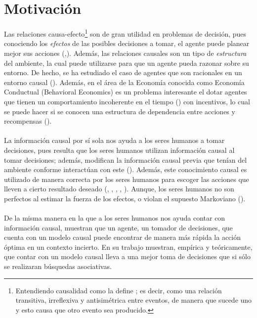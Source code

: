 \documentclass[11pt]{article}
\theoremstyle{plain}
\begin{document}
\section{Motivación}
Las relaciones causa-efecto\footnote{Entendiendo causalidad como la define \cite{spirtes2000causation}; es decir, como una relación transitiva, irreflexiva y antisimétrica entre eventos, de manera que sucede uno y esto causa que otro evento sea producido.} son de gran utilidad en problemas de decisión, pues conociendo los \textit{efectos} de las posibles decisiones a tomar, el agente puede planear mejor sus acciones (\cite{hagmayer2013repeated},\cite{pearlwhy}). Además, las relaciones causales son un tipo de \textit{estructura} del ambiente, la cual puede utilizarse para que un agente pueda razonar sobre su entorno. De hecho, se ha estudiado el caso de agentes que son racionales en un entorno causal (\cite{board2006equivalence}). Además, en el área de la Economía conocida como Economía Conductual (Behavioral Economics) es un problema interesante el dotar agentes que tienen un comportamiento incoherente en el tiempo (\cite{kleinberg2014time}) con incentivos, lo cual se puede hacer si se conocen una estructura de dependencia entre acciones y recompensas (\cite{albers2016motivating}). \\
\\
\indent La información causal por sí sola nos ayuda a los seres humanos a tomar decisiones, pues resulta que los seres humanos utilizan información causal al tomar decisiones; además, modifican la información causal previa que tenían del ambiente conforme interactúan con este (\cite{hagmayer2013repeated}). Además, este conocimiento causal es utilizado de manera correcta por los seres humanos para escoger las acciones que lleven a cierto resultado deseado (\cite{sloman2006causal}, \cite{nichols2007decision}, \cite{meder2010observing}, \cite{hagmayer2013repeated}, \cite{danks2014unifying}). Aunque, los seres humanos no son perfectos al estimar la fuerza de los efectos, o violan el supuesto Markoviano (\cite{rottman2014reasoning}). \\
\\
\indent De la misma manera en la que a los seres humanos nos ayuda contar con información causal, \cite{lattimoreNIPS2016} muestran que un agente, un tomador de decisiones, que cuenta con un modelo causal puede encontrar de manera más rápida la acción óptima en un contexto incierto. En su trabajo muestran, empírica y teóricamente, que contar con un modelo causal lleva a una mejor toma de decisiones que si sólo se realizaran búsquedas asociativas.\\
\end{document}
